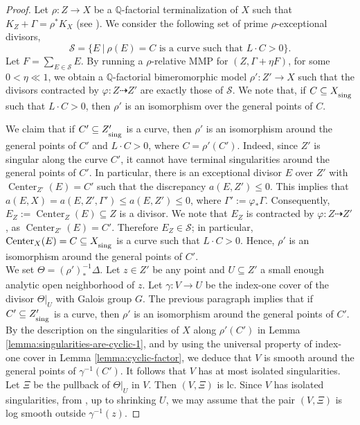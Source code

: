 \documentclass[12pt]{amsart}
\newcommand{\<}{\leq}
\def\subset{\subseteq}
\newcommand{\bir}{\dashrightarrow}
\theoremstyle{remark}
\theoremstyle{definition}
\theoremstyle{definition}
\numberwithin{equation}{section}
\theoremstyle{definition}
\theoremstyle{definition}
\def\Center{\operatorname{Center}}
\def\sing{\operatorname{\textsubscript{\rm sing}}}
\begin{document}
\begin{proof}
Let $\rho \colon Z \to X$ be a $\mathbb{Q}$-factorial terminalization of $X$ such that $K_Z+\Gamma = \rho^* K_X$ (see \cite[Theorem 3.6]{DasOu2022}). 
We consider the following set of prime $\rho$-exceptional divisors, 
\[ \mathcal{S} = \{ E \ |\  \rho(E)=C \mbox{ is a curve such that } L\cdot C >0 \}.\] 
Let $F = \sum_{E\in \mathcal{S}} E$. 
By running a $\rho$-relative MMP for $(Z, \Gamma + \eta F)$, for some  $0<\eta\ll 1$, 
we obtain a  $\mathbb{Q}$-factorial bimeromorphic model $\rho' \colon Z' \to X$ such that the divisors contracted by $\varphi: Z\bir Z'$ are exactly  those of $\mathcal{S}$. 
We note that, if $C\subseteq X_{\sing}$ such that $L\cdot C > 0$, then $\rho'$ is an isomorphism over the general points of $C$.


We claim that if $C' \subseteq Z'_{\sing}$ is a curve, then $\rho'$ is an isomorphism around the general points of $C'$ and $L\cdot C > 0$, where $C = \rho'(C')$. 
Indeed, since $Z'$ is singular along the curve  $C'$, it cannot have terminal singularities around the general  points of $C'$. 
In particular, there is an exceptional divisor $E$ over $Z'$ with $\Center_{Z'}(E)=C'$ such that the discrepancy $a(E, Z')\< 0$. This implies that $a(E, X)=a(E, Z', \Gamma')\<a(E, Z')\< 0$, where $\Gamma':=\varphi_*\Gamma$. 
Consequently, $E_Z:=\Center_Z(E)\subset Z$ is a divisor. 
We note that $E_Z$ is contracted by $\varphi:Z\bir Z'$, as $\Center_{Z'}(E)=C'$. 
Therefore $E_Z\in \mathcal{S}$; in particular, $\Center_X(E)= C\subset X_{\sing}$ is a curve such that $L\cdot C >0$. 
Hence, $\rho'$ is an isomorphism around the general points of $C'$. 
\\


We set $\Theta = (\rho')^{-1}_*\Delta$.  
Let $z\in Z'$ be any point and $U \subseteq Z'$ a small enough analytic open neighborhood of $z$. 
Let $\gamma\colon V\to U$ be the index-one cover of the divisor $\Theta|_U$ with Galois group $G$.  
The previous paragraph implies that if $C'\subseteq Z'_{\sing}$ is a curve, then $\rho'$ is an isomorphism around the general points of $C'$.  
By the description on the singularities of $X$ along $\rho'(C')$ in Lemma \ref{lemma:singularities-are-cyclic-1}, 
and by using the universal property of index-one cover in Lemma \ref{lemma:cyclic-factor}, 
we deduce that  $V$ is smooth around the general points of $\gamma^{-1}(C')$.  
It follows that $V$ has at most isolated singularities. 
Let $\Xi$ be the pullback of $\Theta|_U$ in $V$. 
Then $(V,\Xi)$ is lc. 
Since $V$ has isolated singularities, from \cite[Proposition 16.6]{Kol92},  up to shrinking $U$, 
we may assume that the pair $(V,\Xi)$ is log smooth outside $\gamma^{-1}(z)$. 


\end{proof}
\end{document}

